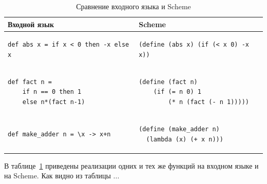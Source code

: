 \documentclass[12pt,a4paper,oneside]{extarticle}
\begin{document}
        \begin{table}[h!]
            \label{tabular:syntax}
            \centering        
            \begin{tabular}{|l|l|}
                \hline
                \textbf{Входной язык} & \textbf{Scheme}
                \\ \hline
                    \begin{lstlisting}
def abs x = if x < 0 then -x else x
                    \end{lstlisting} &
                    \begin{lstlisting}
(define (abs x) (if (< x 0) -x x))
                    \end{lstlisting}
                \\ \hline
                    \begin{lstlisting}
def fact n = 
    if n == 0 then 1
    else n*(fact n-1)
                    \end{lstlisting} &
                    \begin{lstlisting}
(define (fact n)
    (if (= n 0) 1
        (* n (fact (- n 1)))))
                    \end{lstlisting}
                \\ \hline
                    \begin{lstlisting}
def make_adder n = \x -> x+n
                    \end{lstlisting} &
                    \begin{lstlisting}
(define (make_adder n) 
  (lambda (x) (+ x n)))
                    \end{lstlisting}
                \\ \hline
            \end{tabular}
        \caption{Сравнение входного языка и Scheme}
        \end{table}

В таблице~\ref{tabular:syntax} приведены реализации одних и тех же функций на входном языке и на Scheme. Как видно из таблицы ...

    \clearpage
\end{document}
